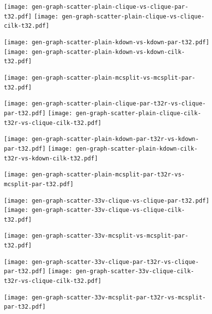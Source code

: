 \documentclass{llncs}
\begin{document}
\begin{figure}[p]
    \texttt{[image: gen-graph-scatter-plain-clique-vs-clique-par-t32.pdf]}
    \hfill
    \texttt{[image: gen-graph-scatter-plain-clique-vs-clique-cilk-t32.pdf]}

    \vspace*{1em}

    \texttt{[image: gen-graph-scatter-plain-kdown-vs-kdown-par-t32.pdf]}
    \hfill
    \texttt{[image: gen-graph-scatter-plain-kdown-vs-kdown-cilk-t32.pdf]}

    \vspace*{1em}

    \texttt{[image: gen-graph-scatter-plain-mcsplit-vs-mcsplit-par-t32.pdf]}

\end{figure}

\begin{figure}[p]
    \texttt{[image: gen-graph-scatter-plain-clique-par-t32r-vs-clique-par-t32.pdf]}
    \hfill
    \texttt{[image: gen-graph-scatter-plain-clique-cilk-t32r-vs-clique-cilk-t32.pdf]}

    \vspace*{1em}

    \texttt{[image: gen-graph-scatter-plain-kdown-par-t32r-vs-kdown-par-t32.pdf]}
    \hfill
    \texttt{[image: gen-graph-scatter-plain-kdown-cilk-t32r-vs-kdown-cilk-t32.pdf]}

    \vspace*{1em}

    \texttt{[image: gen-graph-scatter-plain-mcsplit-par-t32r-vs-mcsplit-par-t32.pdf]}

\end{figure}

\begin{figure}[p]
    \texttt{[image: gen-graph-scatter-33v-clique-vs-clique-par-t32.pdf]}
    \hfill
    \texttt{[image: gen-graph-scatter-33v-clique-vs-clique-cilk-t32.pdf]}

    \vspace*{1em}

    \texttt{[image: gen-graph-scatter-33v-mcsplit-vs-mcsplit-par-t32.pdf]}
\end{figure}

\begin{figure}[p]
    \texttt{[image: gen-graph-scatter-33v-clique-par-t32r-vs-clique-par-t32.pdf]}
    \hfill
    \texttt{[image: gen-graph-scatter-33v-clique-cilk-t32r-vs-clique-cilk-t32.pdf]}

    \vspace*{1em}

    \texttt{[image: gen-graph-scatter-33v-mcsplit-par-t32r-vs-mcsplit-par-t32.pdf]}

\end{figure}
\end{document}

